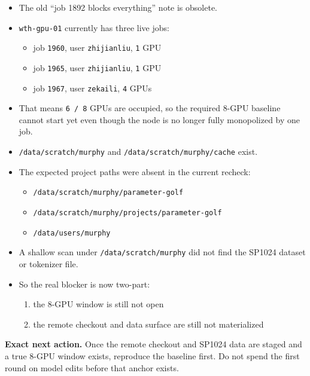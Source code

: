 \documentclass[11pt]{article}
\begin{document}
\begin{itemize}
    \item The old ``job 1892 blocks everything'' note is obsolete.
    \item \texttt{wth-gpu-01} currently has three live jobs:
    \begin{itemize}
        \item job \texttt{1960}, user \texttt{zhijianliu}, \texttt{1} GPU
        \item job \texttt{1965}, user \texttt{zhijianliu}, \texttt{1} GPU
        \item job \texttt{1967}, user \texttt{zekaili}, \texttt{4} GPUs
    \end{itemize}
    \item That means \texttt{6 / 8} GPUs are occupied, so the required 8-GPU baseline cannot start yet even though the node is no longer fully monopolized by one job.
    \item \texttt{/data/scratch/murphy} and \texttt{/data/scratch/murphy/cache} exist.
    \item The expected project paths were absent in the current recheck:
    \begin{itemize}
        \item \texttt{/data/scratch/murphy/parameter-golf}
        \item \texttt{/data/scratch/murphy/projects/parameter-golf}
        \item \texttt{/data/users/murphy}
    \end{itemize}
    \item A shallow scan under \texttt{/data/scratch/murphy} did not find the SP1024 dataset or tokenizer file.
    \item So the real blocker is now two-part:
    \begin{enumerate}
        \item the 8-GPU window is still not open
        \item the remote checkout and data surface are still not materialized
    \end{enumerate}
\end{itemize}

\vspace{0.4em}
\noindent
\colorbox{PlanLite}{%
    \parbox{\dimexpr\linewidth-2\fboxsep\relax}{%
        \textbf{Exact next action.}
        Once the remote checkout and SP1024 data are staged and a true 8-GPU window exists, reproduce the baseline first.
        Do not spend the first round on model edits before that anchor exists.
    }%
}
\end{document}
